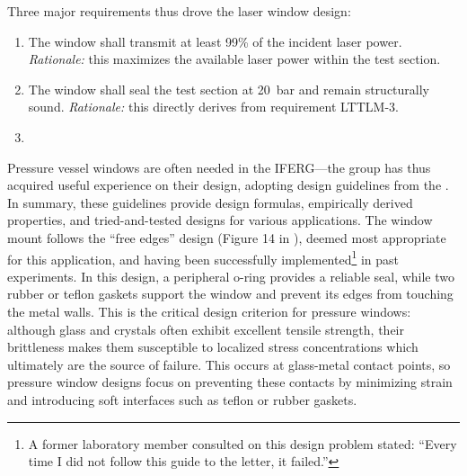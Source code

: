             Three major requirements thus drove the laser window design:
            \begin{enumerate}
                \item The window shall transmit at least 99\% of the incident laser power. \emph{Rationale:} this maximizes the available laser power within the test section.
                \item The window shall seal the test section at 20~bar and remain structurally sound. \emph{Rationale:} this directly derives from requirement LTTLM-3.
                \item {}
            \end{enumerate}

            Pressure vessel windows are often needed in the IFERG---the group has thus acquired useful experience on their design, adopting design guidelines from the \textcite{brookhavennationallaboratoryGuideGlassPlastic2005}. In summary, these guidelines provide design formulas, empirically derived properties, and tried-and-tested designs for various applications. The window mount follows the ``free edges'' design (Figure 14 in \cite{brookhavennationallaboratoryGuideGlassPlastic2005}), deemed most appropriate for this application, and having been successfully implemented\footnote{A former laboratory member consulted on this design problem stated: ``Every time I did not follow this guide to the letter, it failed.''} in past experiments. In this design, a peripheral o-ring provides a reliable seal, while two rubber or teflon gaskets support the window and prevent its edges from touching the metal walls. This is the critical design criterion for pressure windows: although glass and crystals often exhibit excellent tensile strength, their brittleness makes them susceptible to localized stress concentrations which ultimately are the source of failure. This occurs at glass-metal contact points, so pressure window designs focus on preventing these contacts by minimizing strain and introducing soft interfaces such as teflon or rubber gaskets.

